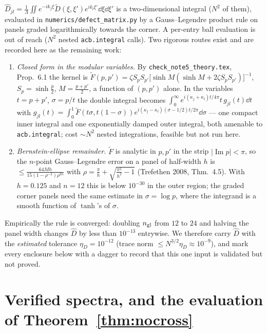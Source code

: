 \documentclass[11pt]{article}
\begin{document}
$\widehat D_{jl}=\frac1\Lambda\iint e^{-ik_j\xi}\widetilde D(\xi,\xi')e^{ik_l\xi'}\dd\xi\dd\xi'$ is a
two-dimensional integral ($N^2$ of them), evaluated in \texttt{numerics/defect\_matrix.py} by a
Gauss--Legendre product rule on panels graded logarithmically towards the corner.  A per-entry
ball evaluation is out of reach ($N^2$ nested \texttt{acb.integral} calls).  Two rigorous routes
exist and are recorded here as the remaining work:
\begin{enumerate}[label=(\alph*),leftmargin=1.8em]
\item \emph{Closed form in the modular variables.}  By \texttt{check\_note5\_theory.tex}, Prop.~6.1
 the kernel is $\widetilde F(p,p')=\zeta S_pS_{p'}\bigl[\sinh M(\sinh M+2\zeta S_pS_{p'})\bigr]^{-1}$,
 $S_p=\sinh\frac p2$, $M=\frac{p+p'}2$, a function of $(p,p')$ alone.  In the variables
 $t=p+p'$, $\sigma=p/t$ the double integral becomes
 $\int_0^\infty e^{i(\kappa_j+\kappa_l)t/4\pi}t\,g_{jl}(t)\dd t$ with
 $g_{jl}(t)=\int_0^1\widetilde F(t\sigma,t(1-\sigma))e^{i(\kappa_j-\kappa_l)(\sigma-1/2)t/2\pi}\dd\sigma$
 --- one compact inner integral and one exponentially damped outer integral, both amenable to
 \texttt{acb.integral}; cost $\sim N^2$ nested integrations, feasible but not run here.
\item \emph{Bernstein-ellipse remainder.}  $\widetilde F$ is analytic in $p,p'$ in the strip
 $|\operatorname{Im}p|<\pi$, so the $n$-point Gauss--Legendre error on a panel of half-width $h$ is
 $\le\frac{64Mh}{15(1-\rho^{-2})\rho^{2n}}$ with $\rho=\frac{\pi}{h}+\sqrt{\frac{\pi^2}{h^2}-1}$
 (Trefethen 2008, Thm.~4.5).  With $h=0.125$ and $n=12$ this is below $10^{-30}$ in the outer region;
 the graded corner panels need the same estimate in $\sigma=\log p$, where the integrand is a smooth
 function of $\tanh$'s of $\sigma$.
\end{enumerate}
Empirically the rule is converged: doubling $n_{\rm gl}$ from $12$ to $24$ and halving the panel
width changes $\widehat D$ by less than $10^{-13}$ entrywise.  We therefore carry $\widehat D$ with
the \emph{estimated} tolerance $\eta_D=10^{-12}$ (trace norm $\le N^{3/2}\eta_D\approx10^{-9}$), and
mark every enclosure below with a dagger to record that this one input is validated but not proved.
\section{Verified spectra, and the evaluation of Theorem~\ref{thm:nocross}}\label{sec:eig}\label{sec:num}
\end{document}
